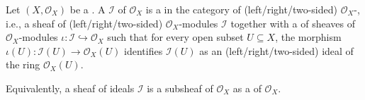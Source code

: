 \begin{definition} \label{definition:ideal_sheaf_of_a_ringed_space}
    Let $(X, \mathcal{O}_X)$ be a . A  $\mathcal{I}$ of $\mathcal{O}_X$ is a  in the category of (left/right/two-sided) $\mathcal{O}_X$-, i.e., a sheaf of (left/right/two-sided) $\mathcal{O}_X$-modules $\mathcal{I}$ together with a  of sheaves of $\mathcal{O}_X$-modules $\iota: \mathcal{I} \hookrightarrow \mathcal{O}_X$ such that for every open subset $U \subseteq X$, the morphism $\iota(U): \mathcal{I}(U) \to \mathcal{O}_X(U)$ identifies $\mathcal{I}(U)$ as an (left/right/two-sided) ideal of the ring $\mathcal{O}_X(U)$.

    Equivalently, a sheaf of ideals $\mathcal{I}$ is a subsheaf of $\mathcal{O}_X$ as a  of $\mathcal{O}_X$.
\end{definition}
